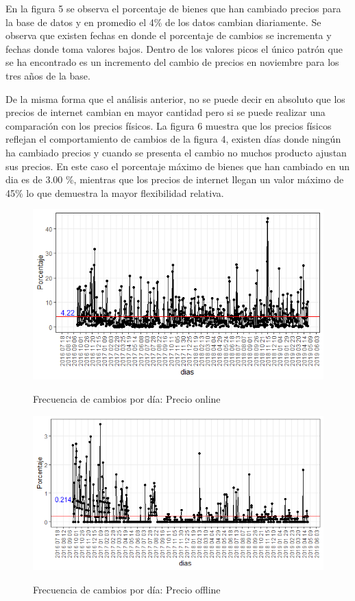\documentclass[12pt,a4paper,pdflatex]{article}
\begin{document}
En la figura 5 se observa el porcentaje de bienes que han cambiado precios para la base de datos y en promedio el 4\% de los datos cambian diariamente. Se observa que existen fechas en donde el porcentaje de cambios se incrementa y fechas donde toma valores bajos. Dentro de los valores picos el único patrón que se ha encontrado es un incremento del cambio de precios en noviembre para los tres años de la base.

De la misma forma que el análisis anterior, no se puede decir en absoluto que los precios de internet cambian en mayor cantidad pero si se puede realizar una comparación con los precios físicos. La figura 6 muestra que los precios físicos reflejan el comportamiento de cambios de la figura 4, existen días donde ningún ha cambiado precios y cuando se presenta el cambio no muchos producto ajustan sus precios. En este caso el porcentaje máximo de bienes que han cambiado en un dia es de 3.00 \%, mientras que los precios de internet llegan un valor máximo de 45\% lo que demuestra la mayor flexibilidad relativa.



\begin{figure}[!ht]
\centering
 \caption{Frecuencia de cambios por día: Precio online}
\includegraphics[scale=0.8]{frecuencia_dias_internet.png}
  \label{fig:Frecuencia de cambios por día: Precio online}
\end{figure}


\begin{figure}[!ht]
\centering
 \caption{Frecuencia de cambios por día: Precio offline}
\includegraphics[scale=0.8]{frecuencia_dias_normal.png}
  \label{fig:Frecuencia de cambios por día: Precio offline}
\end{figure}
\end{document}

